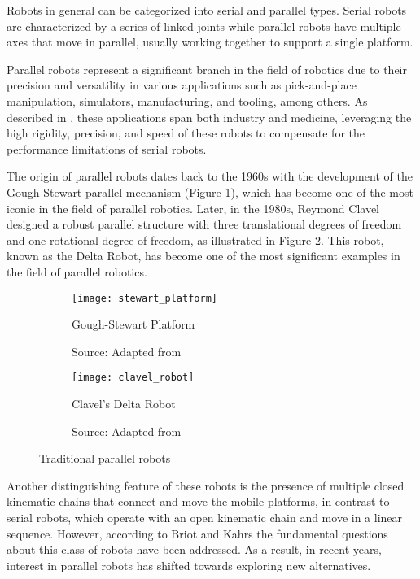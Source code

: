 \par Robots in general can be categorized into serial and parallel types. Serial robots are characterized by a series of linked joints while parallel robots have multiple axes that move in parallel, usually working together to support a single platform.

\par Parallel robots represent a significant branch in the field of robotics due to their precision and versatility in various applications such as pick-and-place manipulation, simulators, manufacturing, and tooling, among others. As described in \cite{shao2024}, these applications span both industry and medicine, leveraging the high rigidity, precision, and speed of these robots to compensate for the performance limitations of serial robots.

\par The origin of parallel robots dates back to the 1960s with the development of the Gough-Stewart \cite{stewart1965} parallel mechanism (Figure \ref{fig:stewart_platform}), which has become one of the most iconic in the field of parallel robotics. Later, in the 1980s, Reymond Clavel designed a robust parallel structure with three translational degrees of freedom and one rotational degree of freedom, as illustrated in Figure \ref{fig:delta_robot}. This robot, known as the Delta Robot, has become one of the most significant examples in the field of parallel robotics. 

\begin{figure}
    \centering
    \begin{subfigure}[t]{0.45\textwidth}
        \texttt{[image: stewart\_platform]}
        \caption{Gough-Stewart Platform}
        \caption*{Source: Adapted from \cite{stewart1965}}
        \label{fig:stewart_platform}
    \end{subfigure}
    \begin{subfigure}[t]{0.45\textwidth}
        \texttt{[image: clavel\_robot]}
        \caption{Clavel's Delta Robot}
        \caption*{Source: Adapted from \cite{sandyEFPL}}
        \label{fig:delta_robot}
    \end{subfigure}
    \caption{Traditional parallel robots}
    \label{fig:traditionals}
\end{figure}

\par Another distinguishing feature of these robots is the presence of multiple closed kinematic chains that connect and move the mobile platforms, in contrast to serial robots, which operate with an open kinematic chain and move in a linear sequence. However, according to Briot and Kahrs \cite{briot2023} the fundamental questions about this class of robots have been addressed. As a result, in recent years, interest in parallel robots has shifted towards exploring new alternatives.

